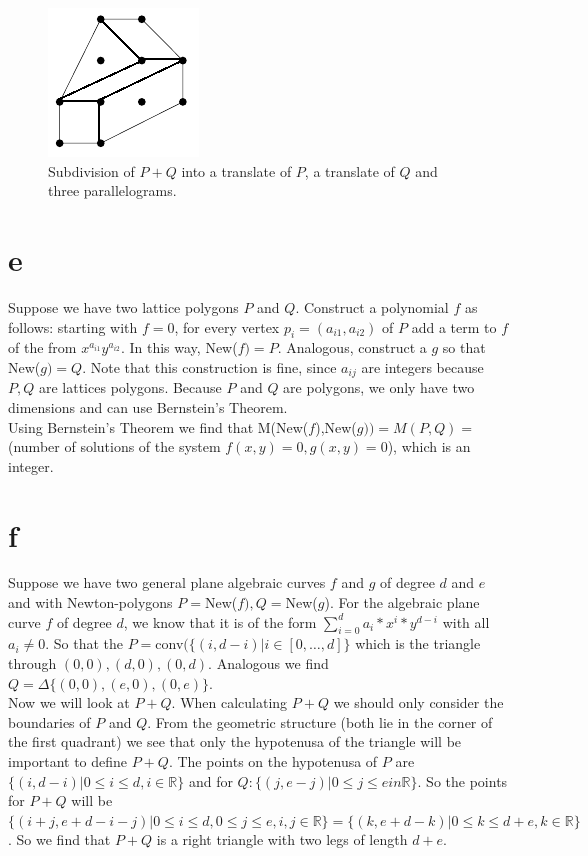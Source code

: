\documentclass[paper=a4, fontsize=11pt]{scrartcl} %
\theoremstyle{plain}
\begin{document}
\begin{figure}[htbp]
   \centering
   \includegraphics{Images/LatticeDivision.png} %
   \caption{Subdivision of $P+Q$ into a translate of $P$, a translate of $Q$ and three parallelograms.}
   \label{fig:ls}
\end{figure}

\section{e}
Suppose we have two lattice polygons $P$ and $Q$. Construct a polynomial $f$ as follows: starting with $f=0$, for every vertex $p_{i} = (a_{i1},a_{i2})$ of $P$ add a term to $f$ of the from $x^{a_{i1}}y^{a_{i2}}$. In this way, New($f) = P$. Analogous, construct a $g$ so that New($g)=Q$. Note that this construction is fine, since $a_{ij}$ are integers because $P,Q$ are lattices polygons. Because $P$ and $Q$ are polygons, we only have two dimensions and can use Bernstein's Theorem.\\
Using Bernstein's Theorem we find that M(New($f$),New($g)) = M(P,Q)= $ (number of solutions of the system $f(x,y)=0,g(x,y)=0$), which is an integer. 

\section{f}
Suppose we have two general plane algebraic curves $f$ and $g$ of degree $d$ and $e$ and with Newton-polygons $P=$New($f), Q=$New($g$). For the algebraic plane curve $f$ of degree $d$, we know that it is of the form $\sum_{i=0}^{d}a_{i}*x^{i}*y^{d-i}$ with all $a_{i}\neq 0$. So that the $P=$conv$(\{(i,d-i)| i\in [0,\ldots,d]\}$ which is the triangle through $(0,0),(d,0),(0,d)$. Analogous we find $Q=\Delta\{(0,0),(e,0),(0,e)\}$.\\

Now we will look at $P+Q$. When calculating $P+Q$ we should only consider the boundaries of $P$ and $Q$. From the geometric structure (both lie in the corner of the first quadrant) we see that only the hypotenusa of the triangle will be important to define $P+Q$. The points on the hypotenusa of $P$ are $\{(i,d-i)| 0\leq i\leq d, i\in \mathbb{R}\}$ and for $Q: \{(j,e-j)| 0\leq j\leq e in \mathbb{R}\}$. So the points for $P+Q$ will be $\{(i+j,e+d-i-j) | 0\leq i\leq d, 0\leq j \leq e, i,j\in \mathbb{R}\} = \{(k,e+d-k) | 0\leq k\leq d+e, k\in \mathbb{R}\}$. So we find that $P+Q$ is a right triangle with two legs of length $d+e$. 
\end{document}
